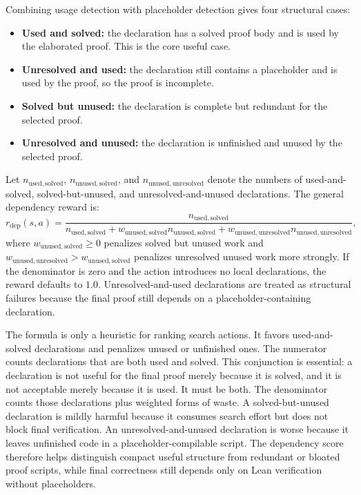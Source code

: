 \documentclass[en]{uet_awesome_thesis/uet-awesome-thesis}
\begin{document}
Combining usage detection with placeholder detection gives four structural cases:
\begin{itemize}
    \item \textbf{Used and solved:} the declaration has a solved proof body and is used by the elaborated proof. This is the core useful case.
    \item \textbf{Unresolved and used:} the declaration still contains a placeholder and is used by the proof, so the proof is incomplete.
    \item \textbf{Solved but unused:} the declaration is complete but redundant for the selected proof.
    \item \textbf{Unresolved and unused:} the declaration is unfinished and unused by the selected proof.
\end{itemize}

Let \(n_{\mathrm{used,solved}}\), \(n_{\mathrm{unused,solved}}\), and
\(n_{\mathrm{unused,unresolved}}\) denote the numbers of used-and-solved, solved-but-unused, and
unresolved-and-unused declarations. The general dependency
reward is:
\[
r_{\mathrm{dep}}(s,a) =
\frac{n_{\mathrm{used,solved}}}
{n_{\mathrm{used,solved}}
 + w_{\mathrm{unused,solved}} n_{\mathrm{unused,solved}}
 + w_{\mathrm{unused,unresolved}} n_{\mathrm{unused,unresolved}}},
\]
where \(w_{\mathrm{unused,solved}} \ge 0\) penalizes solved but unused work and
\(w_{\mathrm{unused,unresolved}} > w_{\mathrm{unused,solved}}\) penalizes unresolved unused work more
strongly. If the denominator is zero and the action introduces no local declarations, the reward defaults
to \(1.0\). Unresolved-and-used declarations are treated as
structural failures because the final proof still depends on a placeholder-containing declaration.

The formula is only a heuristic for ranking search actions. It favors used-and-solved declarations and penalizes unused or unfinished ones.
The numerator counts declarations that are both used and solved. This conjunction is essential: a declaration is not useful for
the final proof merely because it is solved, and it is not acceptable merely because it is used. It must be
both. The denominator counts those declarations plus weighted
forms of waste. A solved-but-unused declaration is mildly harmful because it consumes search effort but
does not block final verification. An unresolved-and-unused declaration is worse because it leaves
unfinished code in a placeholder-compilable script. The dependency score therefore helps distinguish
compact useful structure from redundant or bloated proof scripts, while final correctness still depends
only on Lean verification without placeholders.
\end{document}
